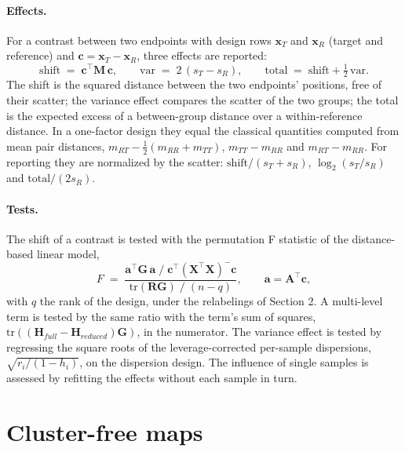 \documentclass{article}
\begin{document}
\paragraph{Effects.}
For a contrast between two endpoints with design rows $\mathbf{x}_T$ and $\mathbf{x}_R$ (target and reference) and $\mathbf{c} = \mathbf{x}_T - \mathbf{x}_R$, three effects are reported:
\begin{equation}
\mathrm{shift} \;=\; \mathbf{c}^\top \mathbf{M}\,\mathbf{c}, \qquad
\mathrm{var} \;=\; 2\,(s_T - s_R), \qquad
\mathrm{total} \;=\; \mathrm{shift} + \tfrac{1}{2}\,\mathrm{var}.
\end{equation}
The shift is the squared distance between the two endpoints' positions, free of their scatter; the variance effect compares the scatter of the two groups; the total is the expected excess of a between-group distance over a within-reference distance. In a one-factor design they equal the classical quantities computed from mean pair distances, $m_{RT} - \tfrac{1}{2}(m_{RR} + m_{TT})$, $m_{TT} - m_{RR}$ and $m_{RT} - m_{RR}$. For reporting they are normalized by the scatter: $\mathrm{shift}/(s_T + s_R)$, $\log_2(s_T/s_R)$ and $\mathrm{total}/(2 s_R)$.

\paragraph{Tests.}
The shift of a contrast is tested with the permutation F statistic of the distance-based linear model,
\begin{equation}
F \;=\; \frac{\mathbf{a}^\top \mathbf{G}\,\mathbf{a}\;/\;\mathbf{c}^\top(\mathbf{X}^\top\mathbf{X})^{-}\mathbf{c}}{\mathrm{tr}(\mathbf{R}\mathbf{G})\;/\;(n - q)}, \qquad \mathbf{a} = \mathbf{A}^\top \mathbf{c},
\end{equation}
with $q$ the rank of the design, under the relabelings of Section 2. A multi-level term is tested by the same ratio with the term's sum of squares, $\mathrm{tr}((\mathbf{H}_{full} - \mathbf{H}_{reduced})\mathbf{G})$, in the numerator. The variance effect is tested by regressing the square roots of the leverage-corrected per-sample dispersions, $\sqrt{r_i/(1 - h_i)}$, on the dispersion design. The influence of single samples is assessed by refitting the effects without each sample in turn.

\section{Cluster-free maps}
\end{document}
